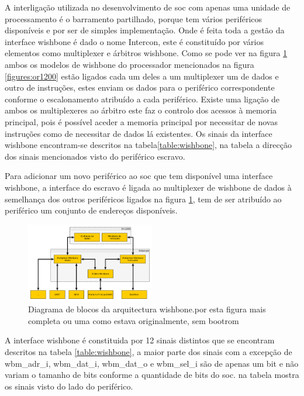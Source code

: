 A interligação utilizada no desenvolvimento de \acrshort{soc} com apenas uma unidade de processamento é o barramento partilhado, porque tem vários periféricos disponíveis e por ser de simples implementação. Onde é feita toda a gestão da interface wishbone é dado o nome Intercon, este é constituído por vários elementos como multiplexer e árbitros wishbone. Como se pode ver na figura \ref{grafos:wishbone} ambos os modelos de wishbone do processador mencionados na figura \ref{figures:or1200} estão ligados cada um deles a um multiplexer um de dados e outro de instruções, estes enviam os dados para o periférico correspondente conforme o escalonamento atribuído a cada periférico. Existe uma ligação de ambos os multiplexeres ao árbitro este faz o controlo dos acessos à memoria principal, pois é possível aceder a memoria principal por necessitar de novas instruções como de necessitar de dados lá existentes. Os sinais da interface wishbone encontram-se descritos na tabela\ref{table:wishbone}, na tabela a direcção dos sinais mencionados visto do periférico escravo.

Para adicionar um novo periférico ao \acrshort{soc} que tem disponível uma interface wishbone, a interface do escravo é ligada ao multiplexer de wishbone de dados à semelhança dos outros periféricos ligados na figura \ref{grafos:wishbone}, tem de ser atribuído ao periférico um conjunto de endereços disponíveis.

\begin{figure}[!htb]
  \centering
  \includegraphics[width=0.5\textwidth]{grafos/wishbone.pdf} %
  \caption[Diagrama de blocos da arquitectura wishbone.]{Diagrama de blocos da arquitectura wishbone.\textcolor[rgb]{1,0,0}{por esta figura mais completa ou uma como estava originalmente, sem bootrom}}
  \label{grafos:wishbone}
\end{figure} 

A interface wishbone é constituida por 12 sinais distintos que se encontram descritos na tabela \ref{table:wishbone}, a maior parte dos sinais com a excepção de wbm\_adr\_i, wbm\_dat\_i, wbm\_dat\_o e wbm\_sel\_i são de apenas um bit e não variam o tamanho de bits conforme a quantidade de bits do \acrshort{soc}. na tabela mostra os sinais visto do lado do periférico.

